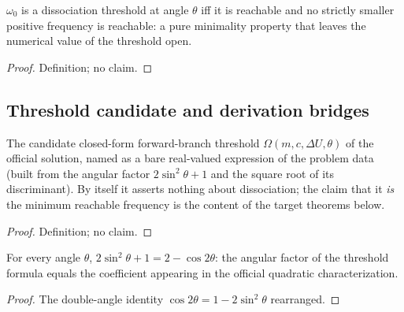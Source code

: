 \begin{definition}
\label{def:IPhO2026Problems_problem_IPhO_2026_1_C_1:IsDissociationThreshold}
$\omega_0$ is a dissociation threshold at angle $\theta$ iff it is
reachable and no strictly smaller positive frequency is reachable: a pure
minimality property that leaves the numerical value of the threshold open.
\end{definition}
\begin{proof}
Definition; no claim.
\end{proof}

\subsection*{Threshold candidate and derivation bridges}

\begin{definition}
\label{def:IPhO2026Problems_problem_IPhO_2026_1_C_1:hbarOmegaMin}
The candidate closed-form forward-branch threshold
$\Omega(m, c, \Delta U, \theta)$ of the official solution, named as a bare
real-valued expression of the problem data (built from the angular factor
$2\sin^2\theta + 1$ and the square root of its discriminant).  By itself it
asserts nothing about dissociation; the claim that it \emph{is} the minimum
reachable frequency is the content of the target theorems below.
\end{definition}
\begin{proof}
Definition; no claim.
\end{proof}

\begin{lemma}
\label{lem:IPhO2026Problems_problem_IPhO_2026_1_C_1:two_sin_sq_add_one_eq}
For every angle $\theta$, $2\sin^2\theta + 1 = 2 - \cos 2\theta$: the
angular factor of the threshold formula equals the coefficient appearing in
the official quadratic characterization.
\end{lemma}
\begin{proof}
The double-angle identity $\cos 2\theta = 1 - 2\sin^2\theta$ rearranged.
\end{proof}

